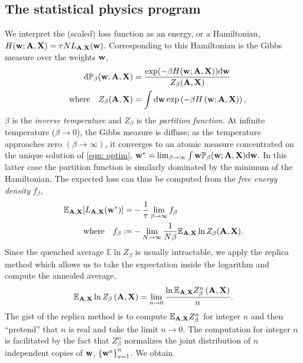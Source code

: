 \documentclass[9pt,twocolumn]{pnas-new}
\begin{document}
\subsection*{The statistical physics program}

We interpret the (scaled) loss function as an energy, or a Hamiltonian, $H(\mathbf{w};\mathbf{A},\mathbf{X})= \tau N L_{\mathbf{A},\mathbf{X}}(\mathbf{w})$. Corresponding to this Hamiltonian is the Gibbs measure over the weights $\mathbf{w}$,
\begin{equation*}
\begin{aligned}
    \mathrm{d} \mathbb{P}_\beta(\mathbf{w};\mathbf{A},\mathbf{X})&=\frac{\exp(-\beta H(\mathbf{w};\mathbf{A},\mathbf{X})) \mathrm{d}\mathbf{w}}{Z_{\beta}(\mathbf{A},\mathbf{X})} \\ \quad \text{where}\quad  Z_{\beta}(\mathbf{A},\mathbf{X})&=\int \mathrm{d} \mathbf{w} \exp\left(-\beta H\left(\mathbf{w};\mathbf{A},\mathbf{X}\right)\right),
\end{aligned}
\end{equation*}
$\beta$ is the \emph{inverse temperature} and $Z_\beta$ is the \emph{partition function}. At infinite temperature ($\beta \to 0$), the Gibbs measure is diffuse; as the temperature approaches zero $(\beta \to \infty)$, it converges to an atomic measure concentrated on the unique solution of \eqref{eqn: optim}, 
$
    \mathbf{w}^*=\lim_{\beta\to\infty}   \int \mathbf{w} \mathbb{P}_\beta(\mathbf{w};\mathbf{A},\mathbf{X}) \mathrm{d} \mathbf{w}.
$
In this latter case the partition function is similarly dominated by the minimum of the Hamiltonian. 
The expected loss can thus be computed from the \emph{free energy density} $f_\beta$,
\begin{equation*}
\begin{aligned}
\mathbb{E}_{\mathbf{A},\mathbf{X}}[L_{\mathbf{A},\mathbf{X}}(\mathbf{w}^*)]=&-\frac{1}{\tau}\lim_{\beta\to \infty} f_\beta\\
\text{where} \quad f_\beta:=&-\lim_{N\to\infty}\frac{1}{N\beta}\mathbb{E}_{\mathbf{A},\mathbf{X}}\ln Z_\beta(\mathbf{A},\mathbf{X}).
\end{aligned}
\end{equation*}
Since the quenched average $\mathbb{E}\ln Z_{\beta}$ is usually intractable, we apply the replica method \cite{mezard1987spin} which allows us to take the expectation inside the logarithm and compute the annealed average,
\begin{equation*}
    \mathbb{E}_{\mathbf{A},\mathbf{X}} \ln Z_\beta \left(\mathbf{A},\mathbf{X}\right)  =\lim_{n \to 0 } \frac{\ln \mathbb{E}_{\mathbf{A},\mathbf{X}}{Z_\beta^n} \left(\mathbf{A},\mathbf{X}\right)}{n}.
\end{equation*}
The gist of the replica method is to compute $\mathbb{E}_{\mathbf{A},\mathbf{X}}{Z_\beta^n}$ for integer $n$ and then ``pretend'' that $n$ is real and take the limit $n \to 0$. The computation for integer $n$ is facilitated by the fact that $Z_\beta^n$ normalizes the joint distribution of $n$ independent copies of $\mathbf{w}$, $\left\{\mathbf{w}^a\right\}_{a = 1}^n$. We obtain
\end{document}
